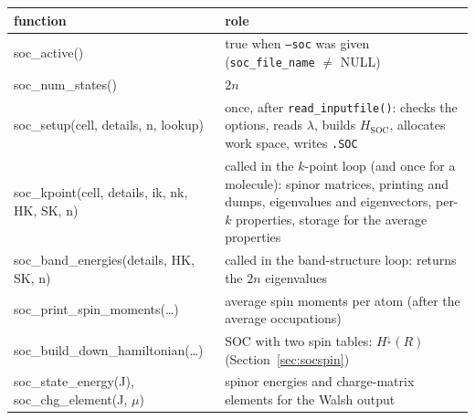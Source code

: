 \documentclass[11pt,a4paper]{article}
\newcommand{\fn}[1]{\texttt{#1()}}
\newcommand{\var}[1]{\texttt{#1}}
\newcommand{\opt}[1]{\texttt{#1}}
\newcommand{\Hsoc}{H_{\mathrm{SOC}}}
\begin{document}
\begin{center}
\begin{tabularx}{\textwidth}{>{\ttfamily}l X}
\toprule
\textrm{\textbf{function}} & \textbf{role} \\
\midrule
soc\_active() & true when \opt{--soc} was given (\var{soc\_file\_name} $\neq$ NULL) \\
soc\_num\_states() & $2n$ \\
soc\_setup(cell, details, n, lookup) & once, after \fn{read\_inputfile}: checks the options, reads $\lambda$, builds $\Hsoc$, allocates work space, writes \texttt{.SOC} \\
soc\_kpoint(cell, details, ik, nk, HK, SK, n) & called in the $k$-point loop (and once for a molecule): spinor matrices, printing and dumps, eigenvalues and eigenvectors, per-$k$ properties, storage for the average properties \\
soc\_band\_energies(details, HK, SK, n) & called in the band-structure loop: returns the $2n$ eigenvalues \\
soc\_print\_spin\_moments(\ldots) & average spin moments per atom (after the average occupations) \\
soc\_build\_down\_hamiltonian(\ldots) & SOC with two spin tables: $H^\downarrow(R)$ (Section~\ref{sec:socspin}) \\
soc\_state\_energy(J), soc\_chg\_element(J, $\mu$) & spinor energies and charge-matrix elements for the Walsh output \\
\bottomrule
\end{tabularx}
\end{center}
\end{document}
